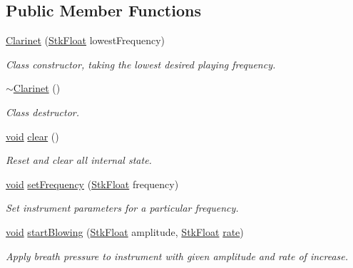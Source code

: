 \subsection*{Public Member Functions}
\begin{DoxyCompactItemize}
\item 
\hyperlink{class_nyq_1_1_clarinet_aa2cd02bc35ab656925da5fde2ba4580e}{Clarinet} (\hyperlink{namespace_nyq_a044fa20a706520a617bbbf458a7db7e4}{Stk\+Float} lowest\+Frequency)
\begin{DoxyCompactList}\small\item\em Class constructor, taking the lowest desired playing frequency. \end{DoxyCompactList}\item 
\hyperlink{class_nyq_1_1_clarinet_a72b6cb72e18616e6e45bf82952c85926}{$\sim$\+Clarinet} ()
\begin{DoxyCompactList}\small\item\em Class destructor. \end{DoxyCompactList}\item 
\hyperlink{sound_8c_ae35f5844602719cf66324f4de2a658b3}{void} \hyperlink{class_nyq_1_1_clarinet_a7b63dcc3ca92669e8d9cf331a06fa3cc}{clear} ()
\begin{DoxyCompactList}\small\item\em Reset and clear all internal state. \end{DoxyCompactList}\item 
\hyperlink{sound_8c_ae35f5844602719cf66324f4de2a658b3}{void} \hyperlink{class_nyq_1_1_clarinet_a0615c7c45e84b6e733aea981ce225223}{set\+Frequency} (\hyperlink{namespace_nyq_a044fa20a706520a617bbbf458a7db7e4}{Stk\+Float} frequency)
\begin{DoxyCompactList}\small\item\em Set instrument parameters for a particular frequency. \end{DoxyCompactList}\item 
\hyperlink{sound_8c_ae35f5844602719cf66324f4de2a658b3}{void} \hyperlink{class_nyq_1_1_clarinet_a05792222cd3d9eb08a8375da97f0b9d2}{start\+Blowing} (\hyperlink{namespace_nyq_a044fa20a706520a617bbbf458a7db7e4}{Stk\+Float} amplitude, \hyperlink{namespace_nyq_a044fa20a706520a617bbbf458a7db7e4}{Stk\+Float} \hyperlink{seqread_8c_ad89d3fac2deab7a9cf6cfc8d15341b85}{rate})
\begin{DoxyCompactList}\small\item\em Apply breath pressure to instrument with given amplitude and rate of increase. \end{DoxyCompactList}\item 

\end{DoxyCompactItemize}
